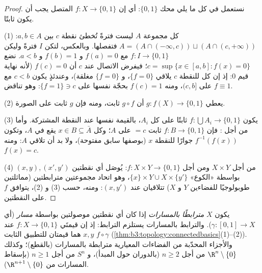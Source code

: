 \begin{proof}
نستعمل في كل ما يلي محك $\{0,1\}$: أي إن $f \colon X \to
\{0,1\}$ المتصل يجب أن
يكون ثابتًا.

(1) كل مجموعة $A$ ليست فترةً تُخطئ نقطة $c$ بين $a, b \in A$:
$A = (A \cap (-\infty, c)) \sqcup (A \cap (c, +\infty))$
فتفصلها. وبالعكس، لتكن $I$ فترةً وليكن $f \colon I
\to \{0,1\}$  مع
$f(a) = 0$ و $f(b) = 1$ و $a < b$. نضع $c = \sup\{x \in [a,b] : f(x) = 0\}$؛ فيفرض الاتصال
عند $c$ أن $f(c) = 0$ (لأنه نهاية قيم $0$: إذ إن كل 
للنقطة $c$ يلاقي $\{f = 0\}$، و $\{f=0\}$ مغلقة)، وعندئذٍ يكون
$c < b$ مع $f \equiv 1$ على $(c, b]$، ومنه $f(c) = 1$ بحجّة
 نفسها على $\{f = 1\} \ni c$: وهو تناقض.

(2) يعطي  $g \colon f(X) \to \{0,1\}$ أن $g \circ f$ ثابت، ومنه فإن
$g$ ثابت على الصورة.

(3) يكون  $f\colon \bigcup A_i \to \{0,1\}$ ثابتًا على كل $A_i$، بالقيمة
نفسها عند النقطة المشتركة. وأما من أجل : فإن $f \colon B \to \{0,1\}$ ثابت
$= c$ على $A$؛ وكل $x \in B \subseteq \bar A$ يقع في  $A$، وتكون $f^{-1}
(f(x))$ جوارًا
للنقطة $x$ (بوصفها سابق مفتوحة)، ولا بد أن تلاقي $A$: ومنه
$f(x) = c$.

(4) من أجل $X \times Y$ ومن أجل $f\colon X\times Y \to \{0,1\}$: يُوصَل أي نقطتين
$(x,y), (x',y')$ بواسطة «الكوع» $\{x\}\times Y \cup X \times \{y'\}$، وهو اتحاد مجموعتين
مترابطتين (مماثلتين طوبولوجيًا للفضاءين $Y$ و $X$) تتلاقيان عند
$(x, y')$: ومنه، حسب (3) و (2)، يتوافق $f$ على النقطتين.
\end{proof}

\begin{definition}\label{def:b3:topology:pathconnected}
يكون $X$ \emph{مترابطًا بالمسارات}
إذا كان أي نقطتين موصولتين بواسطة \emph{مسار} (أي  $\gamma
\colon [0,1] \to X$).
والترابط بالمسارات يستلزم الترابط: إذ إن قيمتَي 
$f \colon X \to \{0,1\}$ عند $x, y$ هما قيمتان للتطبيق الثابت $f\circ\gamma$
(\cref{thm:b3:topology:connectedbasics}(1)--(2)). والأجزاء المحدّبة من الفضاءات المعيارية
مترابطة بالمسارات (بالقطع)؛ وكذلك $\R^n
\setminus \{0\}$ من أجل $n \geq 2$
(بالدوران حول المبدأ)، و $S^n$ من أجل $n \geq 1$ (بإسقاط
المسارات من $\R^{n+1}\setminus
\{0\}$).
\end{definition}

